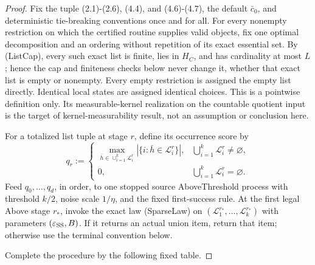 \begin{proof}
Fix the tuple (2.1)-(2.6), (4.4), and (4.6)-(4.7), the default
\(\bar c_0\), and deterministic tie-breaking conventions once and for all.
For every nonempty restriction on which the certified routine supplies valid
objects, fix one optimal decomposition and an ordering without repetition of
its exact essential set. By (ListCap), every such exact list is finite, lies
in \(H_C\), and has cardinality at most \(L\); hence the cap and finiteness
checks below never change it, whether that exact list is empty or nonempty.
Every empty restriction is assigned the empty list directly. Identical local
states are assigned identical choices. This is a pointwise definition only.
Its measurable-kernel realization on the countable quotient input is the
target of kernel-measurability result, not an assumption or conclusion here.

For a totalized list tuple at stage \(r\), define its occurrence score by
\[
q_r:=
\begin{cases}
\displaystyle\max_{\bar h\in\cup_{i=1}^k\mathcal L_i^r}
|\{i:\bar h\in\mathcal L_i^r\}|,
&\bigcup_{i=1}^k\mathcal L_i^r\ne\varnothing,\\[4pt]
0,&\bigcup_{i=1}^k\mathcal L_i^r=\varnothing.
\end{cases}
\tag{5.1}
\]
Feed \(q_0,\ldots,q_d\), in order, to one stopped source
AboveThreshold process with threshold \(k/2\), noise scale \(1/\eta\), and
the fixed first-success rule. At the first legal Above stage \(r_*\), invoke
the exact law (SparseLaw) on
\((\mathcal L_1^{r_*},\ldots,\mathcal L_k^{r_*})\) with parameters
\((\varepsilon_{\rm SS},B)\). If it returns an actual union item, return
that item; otherwise use the terminal convention below.

Complete the procedure by the following fixed table.


\end{proof}
